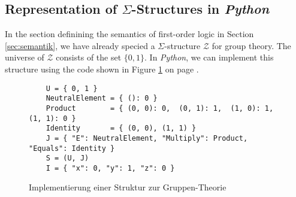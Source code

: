 \subsection{Representation of $\Sigma$-Structures in \textsl{Python}}
In the section definining  the semantics of first-order logic in Section \ref{sec:semantik}, we
have already specied  a $\Sigma$-structure $\mathcal{Z}$ for group theory.  The universe of $\mathcal{Z}$
consists of the set $\{ 0, 1 \}$. In \textsl{Python}, we can 
implement this structure using the code shown in Figure \ref{fig:Group.ipynb} on page
\pageref{fig:Group.ipynb}. 

\begin{figure}[!ht]
\centering
\begin{verbatim}
    U = { 0, 1 }  
    NeutralElement = { (): 0 }
    Product        = { (0, 0): 0,  (0, 1): 1,  (1, 0): 1,  (1, 1): 0 }
    Identity       = { (0, 0), (1, 1) }
    J = { "E": NeutralElement, "Multiply": Product, "Equals": Identity }
    S = (U, J)
    I = { "x": 0, "y": 1, "z": 0 }
\end{verbatim}
\vspace*{-0.3cm}
\caption{Implementierung einer Struktur zur Gruppen-Theorie}
\label{fig:Group.ipynb}
\end{figure}
